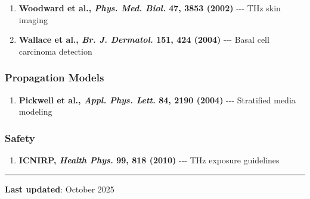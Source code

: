 \begin{enumerate}
\def\labelenumi{\arabic{enumi}.}
\setcounter{enumi}{2}
\tightlist
\item
  \textbf{Woodward et al., \emph{Phys. Med. Biol.} 47, 3853 (2002)}
  -\/-\/- THz skin imaging
\item
  \textbf{Wallace et al., \emph{Br. J. Dermatol.} 151, 424 (2004)}
  -\/-\/- Basal cell carcinoma detection
\end{enumerate}

\subsubsection{Propagation Models}\label{propagation-models}

\begin{enumerate}
\def\labelenumi{\arabic{enumi}.}
\setcounter{enumi}{4}
\tightlist
\item
  \textbf{Pickwell et al., \emph{Appl. Phys. Lett.} 84, 2190 (2004)}
  -\/-\/- Stratified media modeling
\end{enumerate}

\subsubsection{Safety}\label{safety}

\begin{enumerate}
\def\labelenumi{\arabic{enumi}.}
\setcounter{enumi}{5}
\tightlist
\item
  \textbf{ICNIRP, \emph{Health Phys.} 99, 818 (2010)} -\/-\/- THz
  exposure guidelines
\end{enumerate}

\begin{center}\rule{0.5\linewidth}{0.5pt}\end{center}

\textbf{Last updated}: October 2025
